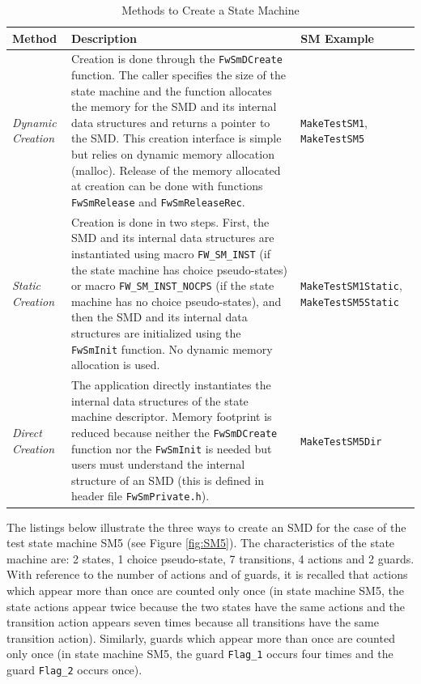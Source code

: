 \documentclass[a4paper,10pt]{article}
\begin{document}
\begin{longtable}{|p{1.5cm}|p{6cm}|p{3cm}|}
\caption{Methods to Create a State Machine} \label{tab:smCreation}\\
\hline
\rowcolor{gray}
\textbf{Method} & \textbf{Description} & \textbf{SM Example}\\
\hline\hline
\emph{Dynamic Creation}  & Creation is done through the \texttt{FwSmDCreate} function. The caller specifies 
the size of the state machine and the function allocates the memory for the SMD and its internal data 
structures and returns a pointer to the SMD. This creation interface is simple but relies on dynamic memory 
allocation (malloc). Release of the memory allocated at creation can be done with functions \texttt{FwSmRelease} 
and \texttt{FwSmReleaseRec}. & \texttt{MakeTestSM1}, \texttt{MakeTestSM5} \\
\hline
\emph{Static Creation} & Creation is done in two steps. First, the SMD and its internal data structures are 
instantiated using macro \texttt{FW\_SM\_INST} (if the state machine has choice pseudo-states) or macro
\texttt{FW\_SM\_INST\_NOCPS} (if the state machine has no choice pseudo-states),
and then the SMD and its internal data structures are initialized 
using the \texttt{FwSmInit} function. No dynamic memory allocation is used. & \texttt{MakeTestSM1Static}, \texttt{MakeTestSM5Static}\\
\hline
\emph{Direct Creation} & The application directly instantiates the internal data structures of the state machine 
descriptor. Memory footprint is reduced because neither the \texttt{FwSmDCreate} function nor the \texttt{FwSmInit} 
is needed but users must understand the internal structure of an SMD (this is defined in header 
file \texttt{FwSmPrivate.h}). & \texttt{MakeTestSM5Dir} \\
\hline
\end{longtable}

\newpage

The listings below illustrate the three ways to create an SMD for the case of the test state machine SM5 
(see Figure \ref{fig:SM5}). The characteristics of the state machine are: 2 states, 1 choice pseudo-state, 
7 transitions, 4 actions and 2 guards. With reference to the number of actions and of guards, it is recalled 
that actions which appear more than once are counted only once (in state machine SM5, the state actions appear 
twice because the two states have the same actions and the transition action appears seven times because all 
transitions have the same transition action). Similarly, guards which appear more than once are counted only 
once (in state machine SM5, the guard \texttt{Flag\_1} occurs four times and the guard \texttt{Flag\_2} occurs once).
\end{document}
